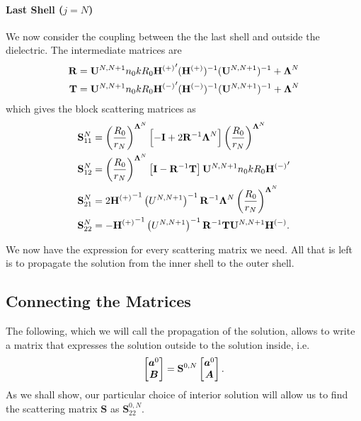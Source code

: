 \paragraph{Last Shell ($j=N$)}
We now consider the coupling between the 
the last shell and outside the dielectric. The 
intermediate matrices are
  \begin{subequations}
  \begin{align}
   \mathbf{R}	&= \mathbf{U}^{N,N+1}n_0kR_0{\mathbf{H}^{(+)}}'(\mathbf{H}^{(+)})^{-1}(\mathbf{U}^{N,N+1})^{-1}+\boldsymbol{\Lambda}^N	\\
   \mathbf{T}	&= \mathbf{U}^{N,N+1}n_0kR_0{\mathbf{H}^{(-)}}'(\mathbf{H}^{(-)})^{-1}(\mathbf{U}^{N,N+1})^{-1}+\boldsymbol{\Lambda}^N
  \end{align}
  \end{subequations}
which gives the block scattering matrices as
  \begin{subequations}
  \begin{align}
    \mathbf{S}^N_{11}	&= \left(\frac{R_0}{r_N}\right)^{\boldsymbol{\Lambda}^N}\left[-\mathbf{I}+2\mathbf{R}^{-1}\boldsymbol{\Lambda}^N\right]\left(\frac{R_0}{r_N}\right)^{\boldsymbol{\Lambda}^N}	\\
    \mathbf{S}^N_{12}	&= \left(\frac{R_0}{r_N}\right)^{\boldsymbol{\Lambda}^N}\left[\mathbf{I}-\mathbf{R}^{-1}\mathbf{T}\right]\mathbf{U}^{N,N+1}n_0kR_0{\mathbf{H}^{(-)}}'		\\
    \mathbf{S}^N_{21}	&= 2{\mathbf{H}^{(+)}}^{-1}\left(U^{N,N+1}\right)^{-1}\mathbf{R}^{-1}\boldsymbol{\Lambda}^N\left(\frac{R_0}{r_N}\right)^{\boldsymbol{\Lambda}^N}				\\
    \mathbf{S}^N_{22}	&= -{\mathbf{H}^{(+)}}^{-1}\left(U^{N,N+1}\right)^{-1}\mathbf{R}^{-1}\mathbf{T}\mathbf{U}^{N,N+1}\mathbf{H}^{(-)}.
  \end{align}
  \end{subequations}

We now have the expression for every scattering matrix we need.
All that is left is to propagate the solution from the inner shell
to the outer shell. 

\subsection{Connecting the Matrices}
The following, which we will call the propagation
of the solution, allows to write a matrix that 
expresses the solution outside to the solution inside, i.e.
  \begin{equation}
   \begin{bmatrix} \boldsymbol{a}^0 \\ \boldsymbol{B} \end{bmatrix} = \mathbf{S}^{0,N}\begin{bmatrix} \boldsymbol{a}^0 \\ \boldsymbol{A} \end{bmatrix}.
  \end{equation}
As we shall show, our particular choice of interior solution will allow
us to find the scattering matrix $\mathbf{S}$ as $\mathbf{S}^{0,N}_{22}$. 


